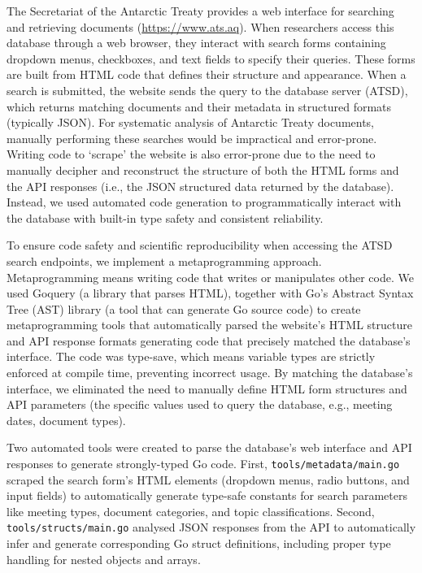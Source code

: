 \documentclass[12pt]{article}
\begin{document}
The Secretariat of the Antarctic Treaty provides a web interface for searching and retrieving documents 
(\url{https://www.ats.aq}).
When researchers access this database through a web browser, 
they interact with search forms containing dropdown menus, checkboxes, and text fields to specify their queries.
These forms are built from HTML code that defines their structure and appearance.
When a search is submitted, the website sends the query to the database server (ATSD), 
which returns matching documents and their metadata in structured formats (typically JSON).
For systematic analysis of Antarctic Treaty documents, manually performing these searches would be impractical and error-prone.
Writing code to `scrape' the website is also error-prone due to the need to manually decipher and reconstruct the structure
of both the HTML forms and the API responses 
(i.e., the JSON structured data returned by the database).
Instead, 
we used automated code generation to programmatically interact with the database
with built-in type safety and consistent reliability.

To ensure code safety and scientific reproducibility 
when accessing the ATSD search endpoints,
we implement a metaprogramming approach.
Metaprogramming means writing code that writes or manipulates other code. 
We used Goquery (a library that parses HTML),
together with Go's Abstract Syntax Tree (AST) library
(a tool that can generate Go source code)
to create metaprogramming tools 
that automatically parsed the website's HTML structure and API response formats
generating code that precisely matched the database's interface.
The code was type-save,
which means variable types are strictly enforced at compile time,
preventing incorrect usage.
By matching the database's interface,
we eliminated the need to manually define HTML form structures and API parameters
(the specific values used to query the database, e.g., meeting dates, document types).

Two automated tools were created 
to parse the database's web interface and API responses to generate strongly-typed Go code.
First, 
{\tt tools/metadata/main.go} scraped the search form's HTML elements 
(dropdown menus, radio buttons, and input fields) 
to automatically generate type-safe constants for search parameters like 
meeting types, document categories, and topic classifications.
Second, 
{\tt tools/structs/main.go} analysed JSON responses from the API 
to automatically infer and generate corresponding Go struct definitions, 
including proper type handling for nested objects and arrays. 
\end{document}

